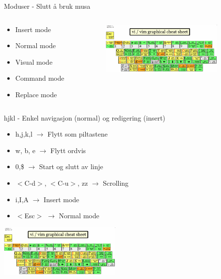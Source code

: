 \documentclass{beamer}
\begin{document}
\begin{frame}{Moduser - Slutt å bruk musa}
	\begin{columns}
		\begin{column}{0.3\textwidth}
			\begin{itemize}
				\item Insert mode
				\item Normal mode
				\item Visual mode
				\item Command mode
				\item Replace mode
			\end{itemize}
		\end{column}
		\begin{column}{0.7\textwidth}
			{\includegraphics[width=230px]{images/vim-cheat-sheet.png}}
		\end{column}
	\end{columns}
\end{frame}
\begin{frame}{hjkl - Enkel navigasjon (normal) og redigering (insert)}
	\begin{center}
		\begin{itemize}
			\item h,j,k,l $\rightarrow$ Flytt som piltastene
			\item w, b, e $\rightarrow$ Flytt ordvis
			\item 0,\$ $\rightarrow$ Start og slutt av linje
			\item $<$C-d$>$, $<$C-u$>$, zz $\rightarrow$ Scrolling
			\item i,I,A $\rightarrow$ Insert mode
			\item $<$Esc$>$ $\rightarrow$ Normal mode
		\end{itemize}
		{\includegraphics[width=230px]{images/vim-cheat-sheet.png}}
	\end{center}
\end{frame}
\end{document}
